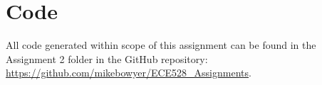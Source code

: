 \documentclass[12pt, letterpaper, final, onecolumn, titlepage] {article}
\begin{document}
\pagebreak

\section{Code}

All code generated within scope of this assignment can be found in the Assignment 2 folder in the GitHub repository:
\url{https://github.com/mikebowyer/ECE528_Assignments}.
\end{document}
